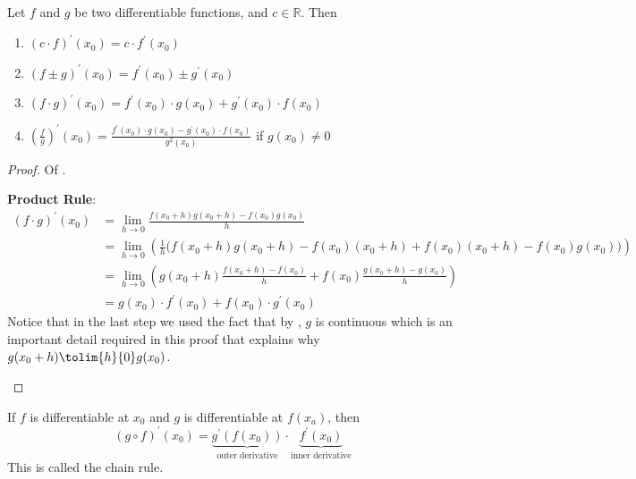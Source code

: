 \begin{thm}\label{thm-derivative-arithmetic}
	Let $f$ and $g$ be two differentiable functions, and $c\in\mathbb{R}$. Then
	\begin{enumerate}
		\item $(c\cdot f)^\prime(x_0) = c \cdot f^\prime(x_0)$
		\item $(f \pm g)^\prime(x_0) = f^\prime(x_0) \pm g^\prime(x_0)$
		\item $(f \cdot g)^\prime(x_0) = f^\prime(x_0) \cdot g(x_0) + g^\prime(x_0) \cdot f(x_0)$
		\item $\left(\tfrac{f}{g}\right)^\prime(x_0) = \tfrac{f^\prime(x_0)\cdot g(x_0) - g^\prime(x_0) \cdot f(x_0)}{g^2(x_0)}$ if $g(x_0)\neq0$
	\end{enumerate}
\end{thm}

\begin{proof}
	Of .
	\begin{flushleft}
		\textbf{Product Rule}:
		\begin{align*}
			(f \cdot g)^\prime(x_0) & = \lim_{h \to 0}\frac{f(x_0+h) g(x_0+h)-f(x_0) g(x_0)}{h}                                                           \\
			                        & = \lim_{h \to 0}\left(\frac{1}{h}\big( f(x_0+h) g(x_0+h) - f(x_0)(x_0+h) +f(x_0)(x_0+h) - f(x_0) g(x_0)\big)\right) \\
			                        & = \lim_{h \to 0}\left(g(x_0+h)\frac{f(x_0+h)-f(x_0)}{h}+f(x_0)\frac{g(x_0+h)-g(x_0)}{h}\right)                      \\
			                        & = g(x_0) \cdot f^\prime(x_0) + f(x_0) \cdot g^\prime(x_0)
		\end{align*}
		Notice that in the last step we used the fact that by ,
		$g$ is continuous which is an important detail required in this proof that explains why
		$g(x_0+h)\tolim{h}{0}g(x_0)$.
	\end{flushleft}
\end{proof}

\begin{thm}\label{thm-chain-rule}
	If $f$ is differentiable at $x_0$ and $g$ is differentiable at $f(x_a)$, then
	\begin{equation}\label{eq-chain-rule}
		(g \circ f)^\prime(x_0) = \underbrace{g^\prime(f(x_0))}_{\text{outer derivative}} \cdot \underbrace{f^\prime(x_0)}_{\text{inner derivative}}
	\end{equation}
	This is called the chain rule.
\end{thm}


